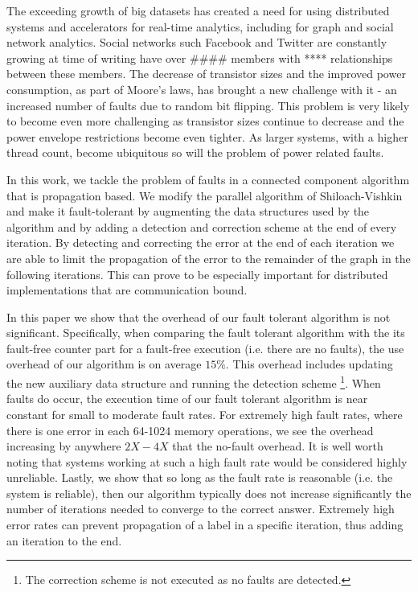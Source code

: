 

The exceeding growth of big datasets has created a need for using distributed systems and 
accelerators for real-time analytics, including for graph and social network analytics. Social 
networks such Facebook and Twitter are constantly growing  at time of writing have over #### 
members with **** relationships between these members.
The decrease of transistor sizes and the improved power consumption, as part of Moore's laws, has 
brought a new challenge with it - an increased number of faults due to random bit flipping. This 
problem is very likely to become even more challenging as transistor sizes continue to decrease and 
the power envelope restrictions become even tighter. As larger systems, with a higher thread count, 
become ubiquitous so will the problem of power related faults.

In this work, we tackle the problem of faults in a connected component algorithm that is 
propagation based. We modify the parallel algorithm of Shiloach-Vishkin \cite{shiloachvishkin} and 
make it fault-tolerant by augmenting the data structures used by the algorithm and by adding a 
detection and correction scheme at the end of every iteration. By detecting and correcting the 
error at the end of each iteration we are able to limit the propagation of the error to the 
remainder of the graph in the following iterations. This can prove to be especially important for 
distributed implementations that are communication bound.


In this paper we show that the overhead of our fault tolerant algorithm is not significant. 
Specifically, when comparing the fault tolerant algorithm with the its fault-free counter part for 
a fault-free execution (i.e. there are no faults), the use overhead of our algorithm is on average 
$15\%$. This overhead includes updating the new auxiliary data structure and running the detection 
scheme \footnote{The correction scheme is not executed as no faults are detected.}. When faults do 
occur, the execution time of our fault tolerant algorithm is near constant for small to moderate 
fault rates. For extremely high fault rates, where there is one error in each 64-1024 memory 
operations, we see the overhead increasing by anywhere $2X-4X$ that the no-fault overhead. It is 
well worth noting that systems working at such a high fault rate would be considered highly 
unreliable. Lastly, we show that so long as the fault rate is reasonable (i.e. the system is 
reliable), then our algorithm typically does not increase significantly the number of iterations 
needed to converge to the correct answer. Extremely high error rates can prevent propagation of a
label in a specific iteration, thus adding an iteration to the end.

